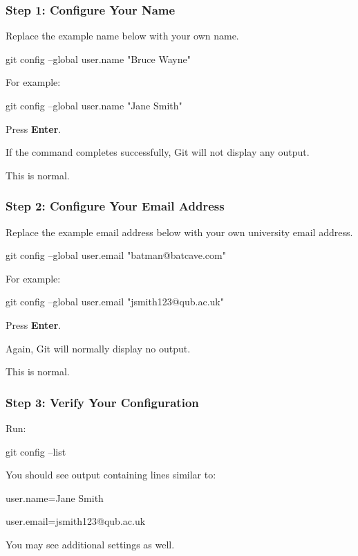 \documentclass{csc2059practical}
\begin{document}
\subsubsection{Step 1: Configure Your Name}
Replace the example name below with your own name.

\begin{terminalplain}
git config --global user.name "Bruce Wayne"
\end{terminalplain}
For example:

\begin{terminalplain}
git config --global user.name "Jane Smith"
\end{terminalplain}
Press \textbf{Enter}.

If the command completes successfully, Git will not display any output.

This is normal.

\subsubsection{Step 2: Configure Your Email Address}
Replace the example email address below with your own university email address.

\begin{terminalplain}
git config --global user.email "batman@batcave.com"
\end{terminalplain}
For example:

\begin{terminalplain}
git config --global user.email "jsmith123@qub.ac.uk"
\end{terminalplain}
Press \textbf{Enter}.

Again, Git will normally display no output.

This is normal.

\subsubsection{Step 3: Verify Your Configuration}
Run:

\begin{terminalplain}
git config --list
\end{terminalplain}
You should see output containing lines similar to:

\begin{terminalplain}
user.name=Jane Smith
\end{terminalplain}
\begin{terminalplain}
user.email=jsmith123@qub.ac.uk
\end{terminalplain}
You may see additional settings as well.
\end{document}
